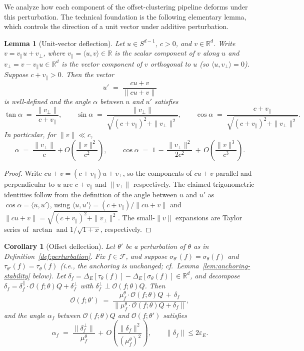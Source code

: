 \documentclass[11pt,letterpaper]{article}
\newtheorem{lemma}[theorem]{Lemma}
\newtheorem{corollary}[theorem]{Corollary}
\theoremstyle{definition}
\begin{document}
We analyze how each component of the offset-clustering pipeline deforms under this perturbation. The technical foundation is the following elementary lemma, which controls the direction of a unit vector under additive perturbation.

\begin{lemma}[Unit-vector deflection]
\label{lem:deflection}
Let $u \in S^{d-1}$, $c > 0$, and $v \in \mathbb{R}^d$. Write $v = v_\parallel u + v_\perp$, where $v_\parallel = \langle u, v \rangle \in \mathbb{R}$ is the scalar component of $v$ along $u$ and $v_\perp = v - v_\parallel u \in \mathbb{R}^d$ is the vector component of $v$ orthogonal to $u$ (so $\langle u, v_\perp \rangle = 0$). Suppose $c + v_\parallel > 0$. Then the vector
\[
u' \;=\; \frac{c u + v}{\| c u + v \|}
\]
is well-defined and the angle $\alpha$ between $u$ and $u'$ satisfies
\[
\tan \alpha \;=\; \frac{\| v_\perp \|}{c + v_\parallel}, \qquad
\sin \alpha \;=\; \frac{\| v_\perp \|}{\sqrt{(c + v_\parallel)^2 + \| v_\perp \|^2}}, \qquad
\cos \alpha \;=\; \frac{c + v_\parallel}{\sqrt{(c + v_\parallel)^2 + \| v_\perp \|^2}}.
\]
In particular, for $\| v \| \ll c$,
\[
\alpha \;=\; \frac{\| v_\perp \|}{c} + O\!\left( \frac{\| v \|^2}{c^2} \right), \qquad
\cos \alpha \;=\; 1 \,-\, \frac{\| v_\perp \|^2}{2 c^2} \,+\, O\!\left( \frac{\| v \|^3}{c^3} \right).
\]
\end{lemma}

\begin{proof}
Write $c u + v = (c + v_\parallel) u + v_\perp$, so the components of $cu + v$ parallel and perpendicular to $u$ are $c + v_\parallel$ and $\| v_\perp \|$ respectively. The claimed trigonometric identities follow from the definition of the angle between $u$ and $u'$ as $\cos\alpha = \langle u, u' \rangle$, using $\langle u, u' \rangle = (c + v_\parallel) / \| cu + v \|$ and $\| cu + v \| = \sqrt{(c + v_\parallel)^2 + \| v_\perp \|^2}$. The small-$\| v \|$ expansions are Taylor series of $\arctan$ and $1 / \sqrt{1 + x}$, respectively.
\end{proof}

\begin{corollary}[Offset deflection]
\label{cor:offset-deflection}
Let $\theta'$ be a perturbation of $\theta$ as in Definition~\ref{def:perturbation}. Fix $f \in \mathcal{F}$, and suppose $\sigma_{\theta'}(f) = \sigma_\theta(f)$ and $\tau_{\theta'}(f) = \tau_\theta(f)$ (i.e., the anchoring is unchanged; cf.\ Lemma~\ref{lem:anchoring-stability} below). Let $\delta_f = \Delta_E[\tau_\theta(f)] - \Delta_E[\sigma_\theta(f)] \in \mathbb{R}^d$, and decompose $\delta_f = \delta_f^\parallel \cdot \mathcal{O}(f; \theta) Q + \delta_f^\perp$ with $\delta_f^\perp \perp \mathcal{O}(f; \theta) Q$. Then
\[
\mathcal{O}(f; \theta') \;=\; \frac{\mu_f^\theta \cdot \mathcal{O}(f; \theta) Q \,+\, \delta_f}{\| \mu_f^\theta \cdot \mathcal{O}(f; \theta) Q + \delta_f \|},
\]
and the angle $\alpha_f$ between $\mathcal{O}(f; \theta) Q$ and $\mathcal{O}(f; \theta')$ satisfies
\[
\alpha_f \;=\; \frac{\| \delta_f^\perp \|}{\mu_f^\theta} \,+\, O\!\left( \frac{\| \delta_f \|^2}{(\mu_f^\theta)^2} \right), \qquad \| \delta_f \| \leq 2 \varepsilon_E.
\]
\end{corollary}
\end{document}
